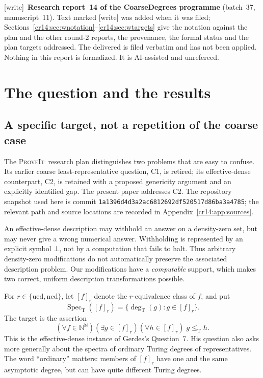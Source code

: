 \documentclass[11pt,a4paper]{article}
\newcommand{\N}{\mathbb N}
\newcommand{\Baire}{\N^{\N}}
\newcommand{\leT}{\leq_{\mathrm T}}
\newcommand{\degT}{\operatorname{deg}_{\mathrm T}}
\newcommand{\ned}{\mathrm{ned}}
\newcommand{\ued}{\mathrm{ued}}
\newcommand{\Spec}{\operatorname{Spec}_{\mathrm T}}
\newcommand{\repo}{\textsc{ProveIt}}
\theoremstyle{definition}
\theoremstyle{remark}
\newcommand{\wtag}{\textup{[write]}}
\begin{document}
\medskip
{\small\noindent
\wtag\ \textbf{Research report~14 of the CoarseDegrees programme} (batch~37, manuscript~11). Text marked \wtag{} was added when it was filed; Sections~\ref{cr14:sec:wnotation}--\ref{cr14:sec:wtargets} give the notation against the plan and the other round-2 reports, the provenance, the formal status and the plan targets addressed. The delivered  is filed verbatim and has not been applied. Nothing in this report is formalized. It is AI-assisted and unrefereed.\par}
\newpage

\section{The question and the results}
\label{cr14:sec:overview}
\subsection{A specific target, not a repetition of the coarse case}
The \repo\ research plan distinguishes two problems that are easy to
confuse. Its earlier coarse least-representative question, C1, is retired;
its effective-dense counterpart, C2, is retained with a proposed genericity
argument and an explicitly identified gap. The present paper addresses C2.
The repository snapshot used here is commit
\texttt{1a1396d4d3a2ac6812692df520517d86ba3a4785}; the relevant path and source
locations are recorded in Appendix~\ref{cr14:app:sources}.\cite{ProveIt}

An effective-dense description may withhold an answer on a density-zero set,
but may never give a wrong numerical answer. Withholding is represented by
an explicit symbol $\bot$, not by a computation that fails to halt. Thus
arbitrary density-zero modifications do not automatically preserve the
associated description problem. Our modifications have a \emph{computable}
support, which makes two correct, uniform description transformations possible.

For $r\in\{\ued,\ned\}$, let $[f]_r$ denote the $r$-equivalence class of
$f$, and put
\[
 \Spec([f]_r)=\{\degT(g):g\in[f]_r\}.
\]
The target is the assertion
\begin{equation}\label{cr14:eq:leastquestion}
 (\forall f\in\Baire)(\exists g\in[f]_r)
       (\forall h\in[f]_r)\;g\leT h.
\end{equation}
This is the effective-dense instance of Gerdes's Question~7. His question
also asks more generally about the spectra of ordinary Turing degrees of
representatives.\cite[Question~7]{Gerdes}
The word ``ordinary'' matters: members of $[f]_r$ have one and the same
asymptotic degree, but can have quite different Turing degrees.
\end{document}
